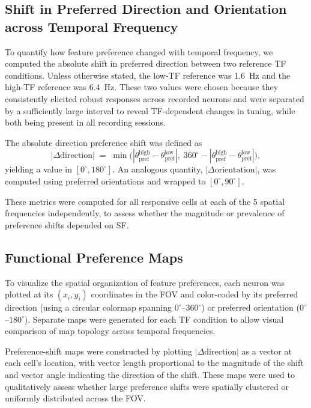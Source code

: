 \documentclass{brandeis-thesis3.3}
\begin{document}
\subsection{Shift in Preferred Direction and Orientation
  across Temporal Frequency}
\label{sec:delta_pref}

To quantify how feature preference changed with temporal
frequency, we computed the absolute shift in preferred
direction between two reference TF conditions. Unless
otherwise stated, the low-TF reference was 1.6~Hz and the
high-TF reference was 6.4~Hz. These two values were chosen
because they consistently elicited robust responses across
recorded neurons and were separated by a sufficiently large
interval to reveal TF-dependent changes in
tuning, while both being present in all recording sessions.

The absolute direction preference shift was defined as
%
\begin{equation}
  |\Delta\text{direction}| \;=\;
    \min\!\bigl(|\theta_{\text{pref}}^{\text{high}}
      - \theta_{\text{pref}}^{\text{low}}|,\;
    360^\circ - |\theta_{\text{pref}}^{\text{high}}
      - \theta_{\text{pref}}^{\text{low}}|\bigr),
  \label{eq:delta_dir}
\end{equation}
%
yielding a value in $[0^\circ, 180^\circ]$. An analogous
quantity, $|\Delta\text{orientation}|$, was computed using
preferred orientations and wrapped to $[0^\circ, 90^\circ]$.

These metrics were computed for all responsive cells at each
of the 5 spatial frequencies independently, to assess whether
the magnitude or prevalence of preference shifts depended on
SF.

\subsection{Functional Preference Maps}

To visualize the spatial organization of feature preferences,
each neuron was plotted at its $(x_i, y_i)$ coordinates in the
FOV and color-coded by its preferred direction (using a
circular colormap spanning $0^\circ$--$360^\circ$) or preferred
orientation ($0^\circ$--$180^\circ$). Separate maps were
generated for each TF condition to allow visual comparison of
map topology across temporal frequencies.

Preference-shift maps were constructed by plotting
$|\Delta\text{direction}|$ as a vector at each cell's
location, with vector length proportional to the magnitude of
the shift and vector angle indicating the direction of the
shift. These maps were used to qualitatively assess whether
large preference shifts were spatially clustered or uniformly
distributed across the FOV.
\end{document}
